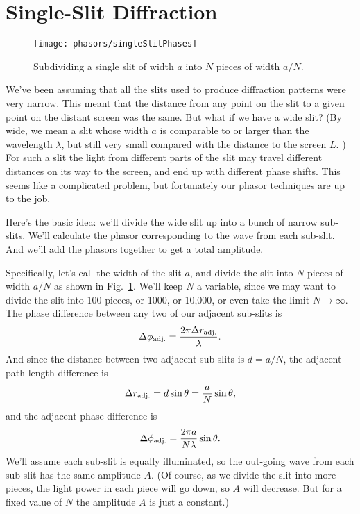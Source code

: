 \newpage
\section{Single-Slit Diffraction}
\label{sec:single_slit_diffraction}

\begin{figure}[t]
\begin{center}
\texttt{[image: phasors/singleSlitPhases]}
\end{center}
\caption{\label{singleSlitPhases}Subdividing a single
slit of width $a$ into $N$ pieces of width $a/N$.}
\end{figure}


We've been assuming that all the slits used to produce diffraction
patterns were very narrow. This meant that the distance from any point
on the slit to a given point on the distant screen was the same. But
what if we have a wide slit?  (By wide, we mean a slit whose width $a$
is comparable to or larger than the wavelength $\lambda$, but still very
small compared with the distance to the screen $L$. ) For such a slit the
light from different parts of the slit may travel different distances
on its way to the screen, and end up with different phase shifts.
This seems like a complicated problem, but fortunately our phasor
techniques are up to the job.

Here's the basic idea: we'll divide the wide slit up into a bunch of
narrow sub-slits.  We'll calculate the phasor corresponding to the
wave from each sub-slit. And we'll add the phasors together to get a
total amplitude.

Specifically, let's call the width of the slit $a$, and divide the
slit into $N$ pieces of width $a/N$
as shown in Fig.~\ref{singleSlitPhases}. We'll keep $N$ a variable, since
we may want to divide the slit into 100 pieces, or 1000, or 10,000, or
even take the limit $N\rightarrow\infty$.  The phase difference
between any two of our adjacent sub-slits is
\begin{equation}
\Delta\phi_{\rm adj.} = \frac{2\pi \Delta r_{\rm adj.}}{\lambda} .
\end{equation}
And since the distance between two adjacent sub-slits is $d=a/N$, 
the adjacent path-length difference is
\begin{equation}
\Delta r_{\rm adj.} = d\sin\theta= \frac{ a}{N} \sin\theta,
\end{equation} 
and the adjacent phase difference is
\begin{equation}
\Delta\phi_{\rm adj.} = \frac{2\pi a}{N\lambda}\sin\theta . 
\end{equation} 
We'll assume
each sub-slit is equally illuminated, so the out-going wave from each
sub-slit has the same amplitude $A$. (Of course, as we divide the slit
into more pieces, the light power in each piece will go down, so $A$
will decrease.  But for a fixed value of $N$ the amplitude $A$ is just
a constant.)

